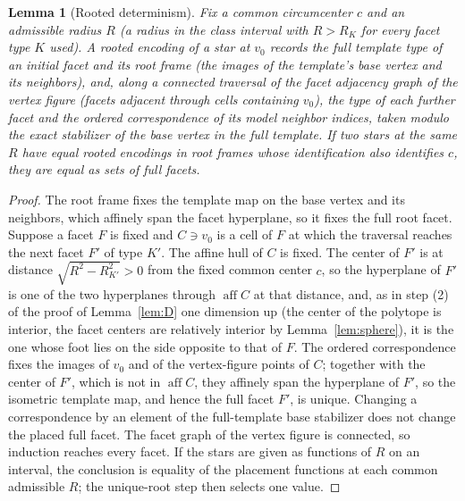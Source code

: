 \documentclass[11pt]{article}
\newtheorem{lemma}[theorem]{Lemma}
\theoremstyle{definition}
\theoremstyle{remark}
\newcommand{\aff}{\operatorname{aff}}
\begin{document}
\begin{appendices}
\label{sec:U3}
\begin{lemma}[Rooted determinism]\label{lem:rooted}
Fix a common circumcenter $c$ and an admissible radius $R$ (a radius in the class interval with
$R>R_K$ for every facet type $K$ used). A \emph{rooted encoding} of a star
at $v_0$ records the full template type of an initial facet and its root
frame (the images of the template's base vertex and its neighbors), and,
along a connected traversal of the facet adjacency graph of the vertex
figure (facets adjacent through cells containing $v_0$), the type of each
further facet and the ordered correspondence of its model neighbor
indices, taken modulo the exact stabilizer of the base vertex in the
\emph{full} template. If two stars at the same $R$ have equal rooted
encodings in root frames whose identification also identifies $c$, they
are equal as sets of full facets.
\end{lemma}
\begin{proof}
The root frame fixes the template map on the base vertex and its
neighbors, which affinely span the facet hyperplane, so it fixes the full
root facet. Suppose a facet $F$ is fixed and $C\ni v_0$ is a cell of $F$
at which the traversal reaches the next facet $F'$ of type $K'$. The affine
hull of $C$ is fixed. The center of $F'$ is at distance
$\sqrt{R^2-R_{K'}^2}>0$ from the fixed common center $c$, so the hyperplane
of $F'$ is one of the two hyperplanes through $\aff C$ at that distance,
and, as in step (2) of the proof of Lemma~\ref{lem:D} one dimension up
(the center of the polytope is interior, the facet centers are relatively
interior by Lemma~\ref{lem:sphere}), it is the one whose foot lies on the
side opposite to that of $F$. The ordered correspondence fixes the images
of $v_0$ and of the vertex-figure points of $C$; together with the center
of $F'$, which is not in $\aff C$, they affinely span the hyperplane of
$F'$, so the isometric template map, and hence the full facet $F'$, is
unique. Changing a correspondence by an element of the full-template base
stabilizer does not change the placed full facet. The facet graph of the
vertex figure is connected, so induction reaches every facet. If the
stars are given as functions of $R$ on an interval, the conclusion is
equality of the placement functions at each common admissible $R$; the
unique-root step then selects one value.
\end{proof}



\end{appendices}
\end{document}
